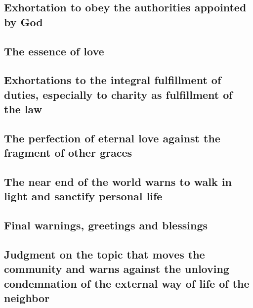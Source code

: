 \hypertarget{exhortation-to-obey-the-authorities-appointed-by-god}{%
\subsection{Exhortation to obey the authorities appointed by
God}\label{exhortation-to-obey-the-authorities-appointed-by-god}}

\hypertarget{the-essence-of-love}{%
\subsection{The essence of love}\label{the-essence-of-love}}

\hypertarget{exhortations-to-the-integral-fulfillment-of-duties-especially-to-charity-as-fulfillment-of-the-law}{%
\subsection{Exhortations to the integral fulfillment of duties,
especially to charity as fulfillment of the
law}\label{exhortations-to-the-integral-fulfillment-of-duties-especially-to-charity-as-fulfillment-of-the-law}}

\hypertarget{the-perfection-of-eternal-love-against-the-fragment-of-other-graces}{%
\subsection{The perfection of eternal love against the fragment of other
graces}\label{the-perfection-of-eternal-love-against-the-fragment-of-other-graces}}

\hypertarget{the-near-end-of-the-world-warns-to-walk-in-light-and-sanctify-personal-life}{%
\subsection{The near end of the world warns to walk in light and
sanctify personal
life}\label{the-near-end-of-the-world-warns-to-walk-in-light-and-sanctify-personal-life}}

\hypertarget{final-warnings-greetings-and-blessings}{%
\subsection{Final warnings, greetings and
blessings}\label{final-warnings-greetings-and-blessings}}

\hypertarget{judgment-on-the-topic-that-moves-the-community-and-warns-against-the-unloving-condemnation-of-the-external-way-of-life-of-the-neighbor}{%
\subsection{Judgment on the topic that moves the community and warns
against the unloving condemnation of the external way of life of the
neighbor}\label{judgment-on-the-topic-that-moves-the-community-and-warns-against-the-unloving-condemnation-of-the-external-way-of-life-of-the-neighbor}}

